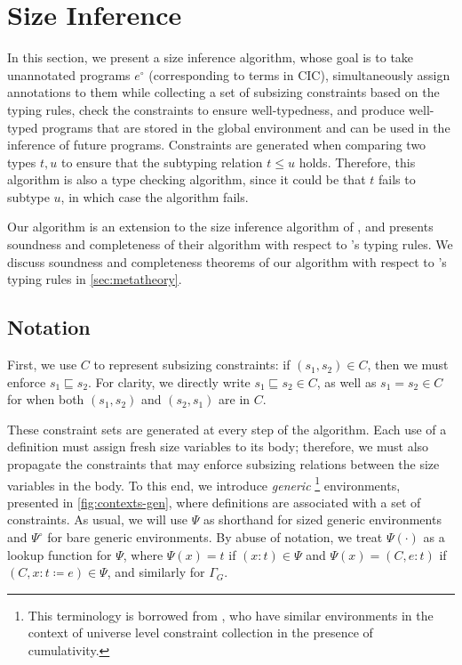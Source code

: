 \section{Size Inference}\label{sec:algorithm}

In this section, we present a size inference algorithm, whose goal is to take unannotated programs $e^\circ$ (corresponding to terms in CIC), simultaneously assign annotations to them while collecting a set of subsizing constraints based on the typing rules, check the constraints to ensure well-typedness, and produce well-typed programs that are stored in the global environment and can be used in the inference of future programs.
Constraints are generated when comparing two types $t, u$ to ensure that the subtyping relation $t \leq u$ holds.
Therefore, this algorithm is also a type checking algorithm, since it could be that $t$ fails to subtype $u$, in which case the algorithm fails.

Our algorithm is an extension to the size inference algorithm of \CIChat, and \citet{cic-hat} presents soundness and completeness of their algorithm with respect to \CIChat's typing rules.
We discuss soundness and completeness theorems of our algorithm with respect to \lang's typing rules in \autoref{sec:metatheory}.

\subsection{Notation}



First, we use $C$ to represent subsizing constraints: if $(s_1, s_2) \in C$, then we must enforce $s_1 \sqsubseteq s_2$.
For clarity, we directly write $s_1 \sqsubseteq s_2 \in C$, as well as $s_1 = s_2 \in C$ for when both $(s_1, s_2)$ and $(s_2, s_1)$ are in $C$.

These constraint sets are generated at every step of the algorithm.
Each use of a definition must assign fresh size variables to its body; therefore, we must also propagate the constraints that may enforce subsizing relations between the size variables in the body.
To this end, we introduce \emph{generic}%
\footnote{This terminology is borrowed from \citet{universes}, who have similar environments in the context of universe level constraint collection in the presence of cumulativity.}
environments, presented in \autoref{fig:contexts-gen}, where definitions are associated with a set of constraints.
As usual, we will use $\Psi$ as shorthand for sized generic environments and $\Psi^\circ$ for bare generic environments.
By abuse of notation, we treat $\Psi(\cdot)$ as a lookup function for $\Psi$, where $\Psi(x) = t$ if $(x : t) \in \Psi$ and $\Psi(x) = (C, e : t)$ if $(C, x : t \coloneqq e) \in \Psi$, and similarly for $\Gamma_G$.

